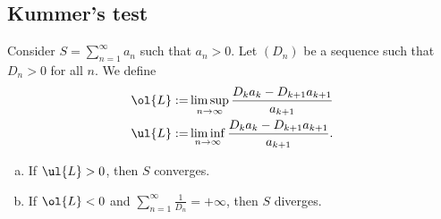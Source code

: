 \subsection{Kummer's test}
\begin{ntheorem}{}
	Consider \(S=\displaystyle\sum_{n=1}^{\infty}a_n\) such that \(a_n>0\). Let \((D_n)\) be a sequence such that \(D_n>0\) for all \(n\). We define
	\begin{align*}
		\ol{L}:=&\limsup_{n\to\infty}\frac{D_ka_k-D_{k+1}a_{k+1}}{a_{k+1}}\\
		\ul{L}:=&\liminf_{n\to\infty}\frac{D_ka_k-D_{k+1}a_{k+1}}{a_{k+1}}.
	\end{align*}
	\begin{enumerate}[(a)]
		\item If \(\ul{L}>0\), then \(S\) converges.
		
		\item If \(\ol{L}<0\) and \(\displaystyle\sum_{n=1}^{\infty}\displaystyle\frac{1}{D_n}=+\infty\), then \(S\) diverges.
	\end{enumerate}
\end{ntheorem}


